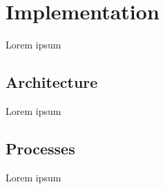 \section{Implementation}
Lorem ipsum

\subsection{Architecture}
Lorem ipsum

\subsection{Processes}
Lorem ipsum

